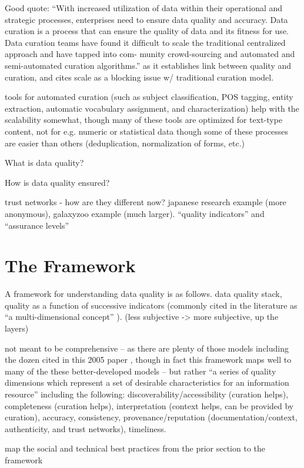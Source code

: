 \documentclass{acm_proc_article-sp}
\begin{document}
Good quote: ``With increased utilization of data within their
operational and strategic processes, enterprises need to ensure data
quality and accuracy. Data curation is a process that can ensure the
quality of data and its ﬁtness for use. Data curation teams have found
it difﬁcult to scale the traditional centralized approach and have
tapped into com- munity crowd-sourcing and automated and
semi-automated curation algorithms.''\cite{curry:community} as it
establishes link between quality and curation, and cites scale as a
blocking issue w/ traditional curation model.

tools for automated curation (such as subject classification, POS
tagging, entity extraction, automatic vocabulary assignment, and
characterization) help with the scalability somewhat, though many of
these tools are optimized for text-type content, not for e.g. numeric
or statistical data though some of these processes are easier than
others (deduplication, normalization of forms, etc.)

What is data quality?

How is data quality ensured?

trust networks - how are they different now? japanese research example (more
anonymous), galaxyzoo example (much larger). ``quality indicators'' and
``assurance levels''

\section{The Framework}
A framework for understanding data quality is as follows.  data
quality stack, quality as a function of successive indicators
(commonly cited in the literature as ``a multi-dimensional concept''
\cite{knight:quality}). (less subjective -> more subjective, up the
layers)

not meant to be comprehensive -- as there are plenty of those models
including the dozen cited in this 2005 paper \cite{knight:quality},
though in fact this framework maps well to many of the these
better-developed models -- but rather ``a series of quality dimensions
which represent a set of desirable characteristics for an information
resource'' \cite{curry:community} including the following:
discoverability/accessibility (curation helps), completeness (curation
helps), interpretation (context helps, can be provided by curation),
accuracy, consistency, provenance/reputation (documentation/context,
authenticity, and trust networks), timeliness.

map the social and technical best practices from the prior section to
the framework
\end{document}
